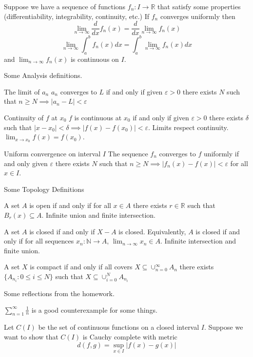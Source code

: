 \documentclass{article}
\newcommand{\N}{\mathbb{N}}
\newcommand{\R}{\mathbb{R}}
\newcommand{\eps}{\varepsilon}
\newcommand{\ra}[1][]{\xrightarrow{#1}}
\begin{document}
\begin{theorem}
  Suppose we have a sequence of functions $f_n:I\ra \R$ that satisfy some properties (differentiability, integrability, continuity, etc.) If $f_n$ converges uniformly then
    $$\lim_{n\to\infty}\frac{d}{dx}f_n(x) =\frac{d}{dx}\lim_{n\to\infty}f_n(x)$$
    $$\lim_{n\to\infty}\int_a^b f_n(x)dx = \int_a^b\lim_{n\to\infty}f_n(x)dx$$
and $\lim_{n\to\infty}f_n(x)$ is continuous on $I$.
\end{theorem}
Some Analysis definitions.
\begin{definition}
  The limit of $a_n$ $a_n$ converges to $L$ if and only if given $\eps>0$ there exists $N$ such that $n\geq N\implies |a_n-L|<\eps$
\end{definition}
\begin{definition}
  Continuity of $f$ at $x_0$ $f$ is continuous at $x_0$ if and only if given $\eps>0$ there exists $\delta$ such that $|x-x_0|<\delta\implies |f(x)-f(x_0)|<\eps$. Limits respect continuity. $\lim_{x\to x_0}f(x)=f(x_0)$.
\end{definition}
\begin{definition}
  Uniform convergence on interval $I$ The sequence $f_n$ converges to $f$ uniformly if and only given $\eps$ there exists $N$ such that $n\geq N\implies |f_n(x)-f(x)|<\eps$ for all $x\in I$.
\end{definition}
Some Topology Definitions
\begin{definition}
  A set $A$ is open if and only if for all $x\in A$ there exists $r\in \R$ such that $B_r(x)\subseteq A$. Infinite union and finite intersection.
\end{definition}
\begin{definition}
  A set $A$ is closed if and only if $X-A$ is closed. Equivalently, $A$ is closed if and only if for all sequences $x_n:\N\ra A$, $\lim_{n\to\infty}x_n\in A$. Infinite intersection and finite union.
\end{definition}
\begin{definition}
  A set $X$ is compact if and only if all covers $X\subseteq \cup_{n=0}^\infty A_n$ there exists $\{A_{n_i}:0\leq i \leq N\}$ such that $X\subseteq \cup_{i=0}^NA_{n_i}$
\end{definition}
Some reflections from the homework.
\begin{fact}
  $\sum_{n=1}^\infty\frac{1}{n}$ is a good counterexample for some things.
\end{fact}
\begin{problem}
  Let $C(I)$ be the set of continuous functions on a closed interval $I$. Suppose we want to show that $C(I)$ is Cauchy complete with metric
  $$d(f,g)=\sup_{x\in I}|f(x)-g(x)|$$
\end{problem}
\end{document}
